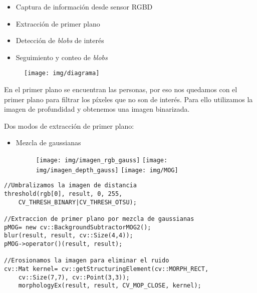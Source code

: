 \documentclass[notes,slidesec,a4]{seminar}
\begin{document}

\begin{hslide}
\begin{itemize}
\item Captura de información desde sensor RGBD
\item Extracción de primer plano
\item Detección de \textit{blobs} de interés
\item Seguimiento y conteo de \textit{blobs}
\end{itemize}

\begin{center}
\begin{figure}
\texttt{[image: img/diagrama]}
\end{figure}
\end{center}
\end{hslide}


\begin{hslide}
En el primer plano se encuentran las personas, por eso nos quedamos con el primer plano para filtrar los píxeles que no son de interés. Para ello utilizamos la imagen de profundidad y obtenemos una imagen binarizada.\par
Dos modos de extracción de primer plano:
\begin{itemize}
\item Mezcla de gaussianas
\begin{figure}
\begin{center}
	\texttt{[image: img/imagen\_rgb\_gauss]}
	\texttt{[image: img/imagen\_depth\_gauss]}
	\texttt{[image: img/MOG]}
\end{center}
\end{figure}
\end{itemize}
\end{hslide}


\begin{hslide}\footnotesize
\begin{lstlisting}
//Umbralizamos la imagen de distancia
threshold(rgb[0], result, 0, 255, 
	CV_THRESH_BINARY|CV_THRESH_OTSU);

//Extraccion de primer plano por mezcla de gaussianas
pMOG= new cv::BackgroundSubtractorMOG2();
blur(result, result, cv::Size(4,4));
pMOG->operator()(result, result);

//Erosionamos la imagen para eliminar el ruido
cv::Mat kernel= cv::getStructuringElement(cv::MORPH_RECT,
	cv::Size(7,7), cv::Point(3,3));
	morphologyEx(result, result, CV_MOP_CLOSE, kernel);
\end{lstlisting}\normalsize
\end{hslide}
\end{document}
